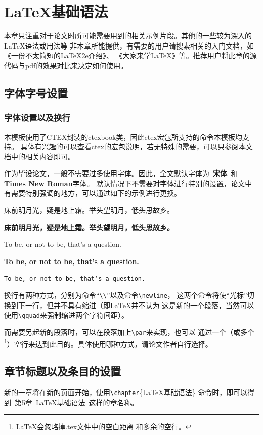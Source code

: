 \chapter{\LaTeX{}基础语法}
\label{chapter-basic}
本章只注重对于论文时所可能需要用到的相关示例片段。其他的一些较为深入的\LaTeX{}语法或用法等
非本章所能提供，有需要的用户请搜索相关的入门文档，如《一份不太简短的\LaTeX2e{}介绍》、
《大家来学\LaTeX{}》等。推荐用户将此章的源代码与pdf的效果对比来决定如何使用。

\section{字体字号设置}
\label{sec-font}

\subsection{字体设置以及换行}
\label{subsec-font}
本模板使用了CTEX封装的ctexbook类，因此ctex宏包所支持的命令本模板均支持。
具体有兴趣的可以查看ctex的宏包说明，若无特殊的需要，可以只参阅本文档中的相关内容即可。

作为毕设论文，一般不需要过多使用字体。因此，全文默认字体为~{\bf 宋体}~和{\bf Times New Roman}字体。
默认情况下不需要对字体进行特别的设置，论文中有需要特别强调的地方，可以通过如下的示例进行更换。

{\heiti 床前明月光，疑是地上霜。举头望明月，低头思故乡。}

{\bf 床前明月光，疑是地上霜。举头望明月，低头思故乡。}

To be, or not to be, that's a question.

\textbf{To be, or not to be, that's a question.}

\texttt{To be, or not to be, that's a question.}

换行有两种方式，分别为命令“\verb|\\|”以及命令\verb|\newline|，
这两个命令将使“光标”切换到下一行，但并不具有缩进（即\LaTeX{}并不认为
这是新的一个段落，当然可以使用\verb|\qquad|来强制缩进两个字符间距）。

而需要另起新的段落时，可以在段落加上\verb|\par|来实现，也可以
通过一个（或多个\footnote{\LaTeX{}会忽略掉.tex文件中的空白距离
和多余的空行。}）空行来达到此目的。具体使用哪种方式，请论文作者自行选择。

\section{章节标题以及条目的设置}
\label{sec-chaptitle}
新的一章将在新的页面开始，使用\texttt{\textbackslash chapter}\{\LaTeX{}基础语法\}
命令时，即可以得到~\hyperref[chapter-basic]{第5章~\LaTeX{}基础语法}~这样的章名称。

